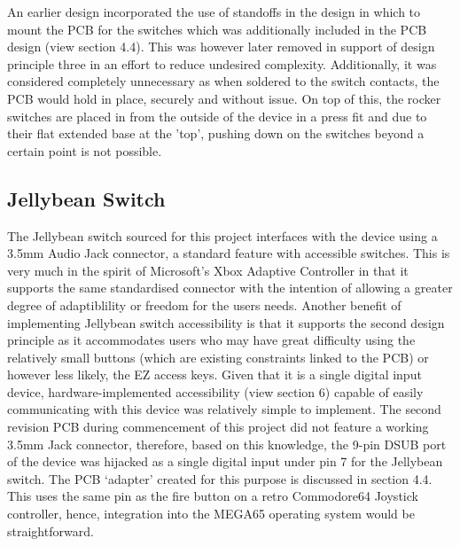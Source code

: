 An earlier design incorporated the use of standoffs in the design in which to mount the PCB for the switches which was additionally included in the PCB design (view section 4.4). %
This was however later removed in support of design principle three in an effort to reduce undesired complexity.
Additionally, it was considered completely unnecessary as when soldered to the switch contacts, the PCB would hold in place, securely and without issue.
On top of this, the rocker switches are placed in from the outside of the device in a press fit and due to their flat extended base at the 'top', pushing down on the switches beyond a certain point is not possible.

\subsection{Jellybean Switch}

The Jellybean switch sourced for this project interfaces with the device using a 3.5mm Audio Jack connector, a standard feature with accessible switches.
This is very much in the spirit of Microsoft's Xbox Adaptive Controller\cite{adaptive} in that it supports the same standardised connector with the intention of allowing a greater degree of adaptiblility or freedom for the users needs.
Another benefit of implementing Jellybean switch accessibility is that it supports the second design principle as it accommodates users who may have great difficulty using the relatively small buttons (which are existing constraints linked to the PCB) or however less likely, the EZ access keys.
Given that it is a single digital input device, hardware-implemented accessibility (view section 6) capable of easily communicating with this device was relatively simple to implement. 
The second revision PCB during commencement of this project did not feature a working 3.5mm Jack connector, therefore, based on this knowledge, the 9-pin DSUB port of the device was hijacked as a single digital input under pin 7 for the Jellybean switch. 
The PCB ‘adapter’ created for this purpose is discussed in section 4.4.
This uses the same pin as the fire button on a retro Commodore64 Joystick controller, hence, integration into the MEGA65 operating system would be straightforward.

